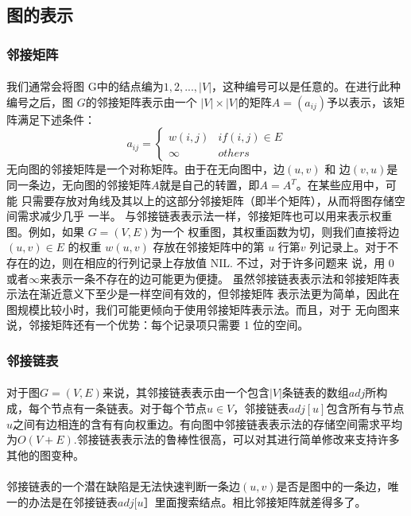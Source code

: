\documentclass[UTF8,a4paper]{ctexart}
\begin{document}
\subsection{图的表示}
\subsubsection{邻接矩阵}
\paragraph{}我们通常会将图 G中的结点编为$1,2,...,|V|$，这种编号可以是任意的。在进行此种编号之后，图 $G$的邻接矩阵表示由一个 $|V|\times|V|$的矩阵$A=(a_{ij})$予以表示，该矩阵满足下述条件：
\[
    a_{ij}=\begin{cases}
        w(i,j) & if(i,j)\in E \\
        \infty & others
    \end{cases}
\]
无向图的邻接矩阵是一个对称矩阵。由于在无向图中，边$(u,v)$ 和
边$(v, u)$是同一条边，无向图的邻接矩阵$A$就是自己的转置，即$ A=A^T$。在某些应用中，可能 只需要存放对角线及其以上的这部分邻接矩阵（即半个矩阵），从而将图存储空间需求减少几乎 一半。
与邻接链表表示法一样，邻接矩阵也可以用来表示权重图。例如，如果 $G = (V,E)$为一个 权重图，其权重函数为切，则我们直接将边$(u, v)\in E$ 的权重 $w(u,v)$ 存放在邻接矩阵中的第 $u$ 行第$v$ 列记录上。对于不存在的边，则在相应的行列记录上存放值 NIL. 不过，对于许多问题来 说，用 0 或者$\infty$来表示一条不存在的边可能更为便捷。
虽然邻接链表表示法和邻接矩阵表示法在渐近意义下至少是一样空间有效的，但邻接矩阵 表示法更为简单，因此在图规模比较小时，我们可能更倾向于使用邻接矩阵表示法。而且，对于 无向图来说，邻接矩阵还有一个优势：每个记录项只需要 1 位的空间。
\subsubsection{邻接链表}
\paragraph{}对于图$G=(V,E)$来说，其邻接链表表示由一个包含$|V|$条链表的数组$adj$所构成，每个节点有一条链表。对于每个节点$u\in V$，邻接链表$adj[u]$包含所有与节点$u$之间有边相连的含有有向权重边。有向图中邻接链表表示法的存储空间需求平均为$O(V+E)$.邻接链表表示法的鲁棒性很高，可以对其进行简单修改来支持许多其他的图变种。
\paragraph{}邻接链表的一个潜在缺陷是无法快速判断一条边$(u, v)$是否是图中的一条边，唯一的办法是在邻接链表$adj[u］$里面搜索结点。相比邻接矩阵就差得多了。
\end{document}
